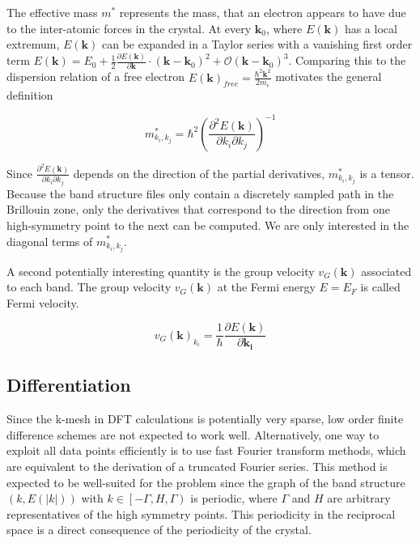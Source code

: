 The effective mass $m^{*}$ represents the mass, that an electron appears to have due to the inter-atomic forces in the crystal. At every $\mathbf{k}_0$, where $E(\mathbf{k})$ has a local extremum, $E(\mathbf{k})$ can be expanded in a Taylor series with a vanishing first order term $E(\mathbf{k}) = E_0 + \frac{1}{2} \frac{\partial E(\mathbf{k})}{\partial \mathbf{k}} \cdot (\mathbf{k}-\mathbf{k}_0)^2 + \mathcal{O}(\mathbf{k}-\mathbf{k}_0)^3$. Comparing this to the dispersion relation of a free electron $E(\mathbf{k})_{free} = \frac{\hbar^2 \mathbf{k}^2}{2 m_e}$ motivates the general definition 

\begin{equation}
    m^{*}_{k_i,k_j} = \hbar^2  \left(\frac{\partial^2E(\mathbf{k})}{\partial k_i \partial k_j}\right)^{-1}
\end{equation}

Since $\frac{\partial^2E(\mathbf{k})}{\partial k_i \partial k_j}$ depends on the direction of the partial derivatives, $m^{*}_{k_i,k_j}$ is a tensor. Because the band structure files only contain a discretely sampled path in the Brillouin zone, only the derivatives that correspond to the direction from one high-symmetry point to the next can be computed. We are only interested in the diagonal terms of $m^{*}_{k_i,k_j}$.



A second potentially interesting quantity is the group velocity $v_{G}(\mathbf{k})$ associated to each band. The group velocity $v_{G}(\mathbf{k})$ at the Fermi energy $E = E_F$ is called Fermi velocity.

\begin{equation}
    v_{G}(\mathbf{k})_{k_i} = \frac{1}{\hbar}\frac{\partial E(\mathbf{k})}{\partial \mathbf{k_i}}
\end{equation}


\subsection{Differentiation}

Since the k-mesh in DFT calculations is potentially very sparse, low order finite difference schemes are not expected to work well. Alternatively, one way to exploit all data points efficiently is to use fast Fourier transform methods, which are equivalent to the derivation of a truncated Fourier series. This method is expected to be well-suited for the problem since the graph of the band structure $(k, E(|k|))$ with $k \in \left[-\Gamma, H, \Gamma \right) $ is periodic, where $\Gamma$ and $H$ are arbitrary representatives of the high symmetry points. This periodicity in the reciprocal space is a direct consequence of the periodicity of the crystal.

